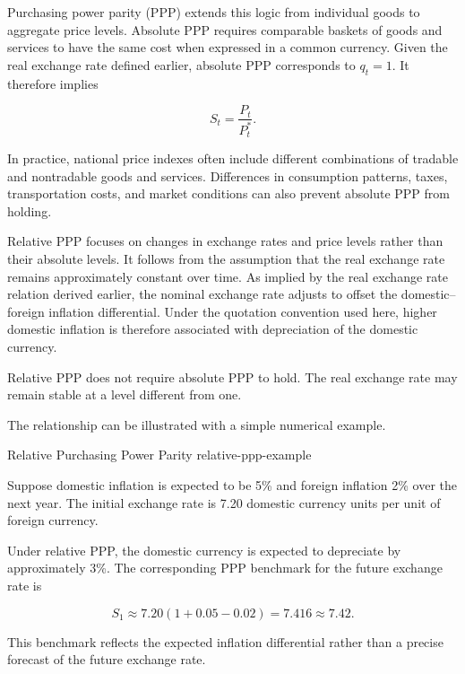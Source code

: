 Purchasing power parity (PPP) extends this logic
from individual goods to aggregate price levels.
Absolute PPP requires comparable baskets of goods
and services to have the same cost when expressed
in a common currency. Given the real exchange rate
defined earlier, absolute PPP corresponds to
$q_t=1$. It therefore implies

\begin{equation}
S_t=\frac{P_t}{P_t^{*}}.
\label{eq:ch10-absolute-ppp}
\end{equation}

In practice, national price indexes often include
different combinations of tradable and nontradable
goods and services. Differences in consumption
patterns, taxes, transportation costs, and market
conditions can also prevent absolute PPP from holding.

Relative PPP focuses on changes in exchange rates
and price levels rather than their absolute levels.
It follows from the assumption that the real exchange
rate remains approximately constant over time.
As implied by the real exchange rate relation derived
earlier, the nominal exchange rate adjusts to offset
the domestic--foreign inflation differential.
Under the quotation convention used here, higher
domestic inflation is therefore associated with
depreciation of the domestic currency.

Relative PPP does not require absolute PPP to hold.
The real exchange rate may remain stable at a level
different from one.

The relationship can be illustrated with a simple
numerical example.

\begin{example}{Relative Purchasing Power Parity}
{relative-ppp-example}

Suppose domestic inflation is expected to be 5\%
and foreign inflation 2\% over the next year. The
initial exchange rate is 7.20 domestic currency
units per unit of foreign currency.

Under relative PPP, the domestic currency is expected
to depreciate by approximately 3\%. The corresponding
PPP benchmark for the future exchange rate is

\[
S_1
\approx
7.20(1+0.05-0.02)
=
7.416
\approx 7.42.
\]

This benchmark reflects the expected inflation
differential rather than a precise forecast of the
future exchange rate.

\end{example}

